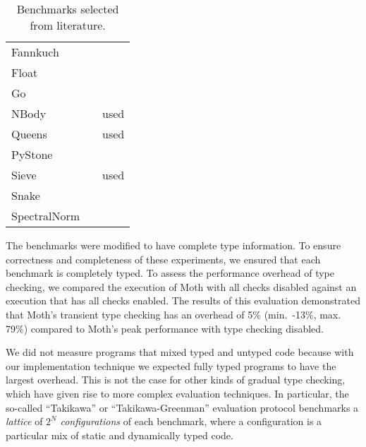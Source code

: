 \documentclass[sigplan,10pt,review,screen]{acmart}\settopmatter{printfolios=true}
\begin{document}
\begin{table}[htb]
  \caption{Benchmarks selected from literature.}
  \label{tab:gradual-benchmarks}
  \begin{center}
    \begin{tabular}{l l r}
      Fannkuch & \cite{Vitousek2017,Greenman2018} \\
      Float & \cite{Vitousek2017,Muehlboeck2017,Greenman2018} \\
      Go & \cite{Vitousek2017,Muehlboeck2017,Greenman2018} \\
      NBody & \cite{Kuhlenschmidt:2018:preprint,Vitousek2017,Greenman2018} & used \cite{Marr2016} \\
      Queens & \cite{Vitousek2017,Muehlboeck2017,Greenman2018} & used \cite{Marr2016} \\
      PyStone & \cite{Vitousek2017,Muehlboeck2017,Greenman2018} \\
      Sieve & \cite{Takikawa2016,Muehlboeck2017,Bauman2017,Richards2017,Greenman2019jfp} & used \cite{Marr2016} \\
      Snake & \cite{Takikawa2016,Muehlboeck2017,Bauman2017,Richards2017,Greenman2019jfp} \\
      SpectralNorm & \cite{Vitousek2017,Muehlboeck2017,Greenman2018} \\
    \end{tabular}
  \end{center}
\end{table}

The benchmarks were modified to have complete type information.  To
ensure correctness and completeness of these experiments, we ensured that each benchmark is completely typed.  To assess the performance
overhead of type checking, we compared the execution of Moth with all
checks disabled against an execution that has all checks enabled.  The
results of this evaluation demonstrated that Moth's transient type checking has an overhead of 5\% (min.\ -13\%,
max. 79\%) compared to Moth's peak performance with type checking disabled.

We did not measure programs that mixed typed and untyped code because
with our implementation technique we expected fully typed programs to
have the largest overhead. This is not the case for other kinds of
gradual type checking, which have given rise to more complex
evaluation techniques.  In particular, the so-called ``Takikawa'' or
``Takikawa-Greenman'' evaluation protocol \cite{Takikawa2016,Greenman2019jfp}
benchmarks a \emph{lattice} of $2^N$ \emph{configurations} of each
benchmark, where a configuration is a particular mix of static and
dynamically typed code.
\end{document}
